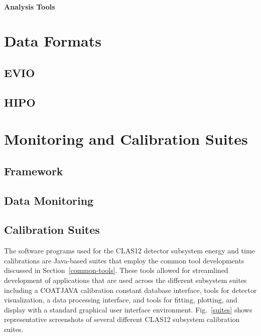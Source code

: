 \documentclass{elsart}
\begin{document}
\paragraph{Analysis Tools}

\section{Data Formats}

\subsection{EVIO}

\subsection{HIPO}

\section{Monitoring and Calibration Suites}

\subsection{Framework}

\subsection{Data Monitoring}

\subsection{Calibration Suites}

The software programs used for the CLAS12 detector subsystem energy and time calibrations are
Java-based suites that employ the common tool developments discussed in Section~\ref{common-tools}.
These tools allowed for streamlined development of applications that are used across the different
subsystem suites including a COATJAVA calibration constant database interface, tools for detector
visualization, a data processing interface, and tools for fitting, plotting, and display with a standard
graphical user interface environment. Fig.~\ref{suites} shows representative screenshots of several
different CLAS12 subsystem calibration suites.
\end{document}
